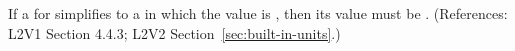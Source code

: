 If a \UnitDefinition for  simplifies to a \Unit in which 
the   value is , then its 
 value must be . (References: L2V1 Section 4.4.3; L2V2
Section~\ref{sec:built-in-units}.)

